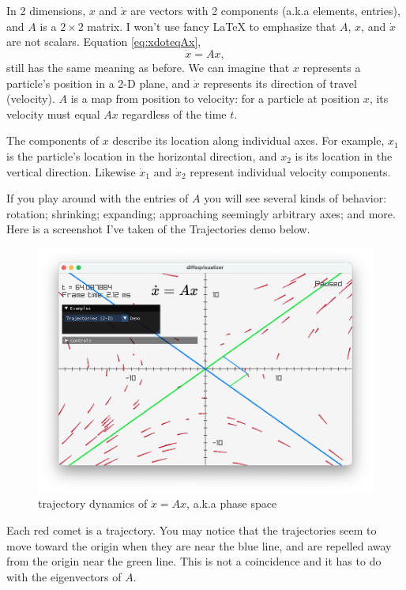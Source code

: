 \documentclass[11pt, oneside]{article}   	%
\begin{document}
In 2 dimensions, $x$ and $\dot{x}$ are vectors with 2 components (a.k.a elements, entries), and $A$ is a $2\times 2$ matrix.
I won't use fancy LaTeX to emphasize that $A$, $x$, and $\dot{x}$ are not scalars.
Equation \ref*{eq:xdoteqAx},
$$ \dot{x} = Ax ,$$
still has the same meaning as before.
We can imagine that $x$ represents a particle's position in a 2-D plane,
and $\dot{x}$ represents its direction of travel (velocity).
$A$ is a map from position to velocity: for a particle at position $x$, its velocity must equal $Ax$ regardless of the time $t$.

The components of $x$ describe its location along individual axes.
For example, $x_1$ is the particle's location in the horizontal direction,
and $x_2$ is its location in the vertical direction.
Likewise $\dot{x}_1$ and $\dot{x}_2$ represent individual velocity components.

If you play around with the entries of $A$ you will see several kinds of behavior:
rotation;
shrinking;
expanding;
approaching seemingly arbitrary axes;
and more.
Here is a screenshot I've taken of the Trajectories demo below.

\begin{figure}[h]
\centering
\includegraphics[scale=0.43]{screenshot_trajectories}
\caption{trajectory dynamics of $\dot{x} = Ax$, a.k.a phase space}
\label{fig:Trajectories}
\end{figure}

Each red comet is a trajectory.
You may notice that the trajectories seem to move toward the origin when they are near the blue line,
and are repelled away from the origin near the green line.
This is not a coincidence and it has to do with the eigenvectors of $A$.
\end{document}
